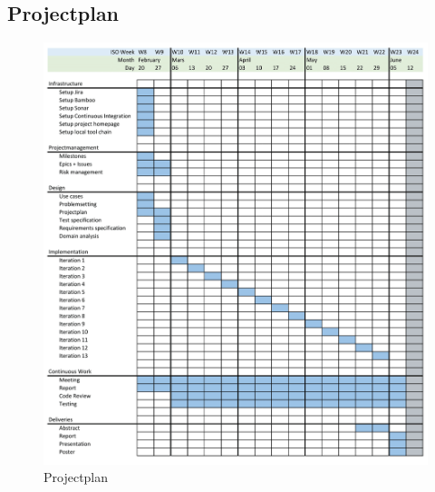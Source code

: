 \subsection{Projectplan}
\begin{figure}[H]
	\centering
	\includegraphics[width=1\textwidth]{img/projectplan}
	\caption{Projectplan}
	\label{fig:Projectplan}
\end{figure}